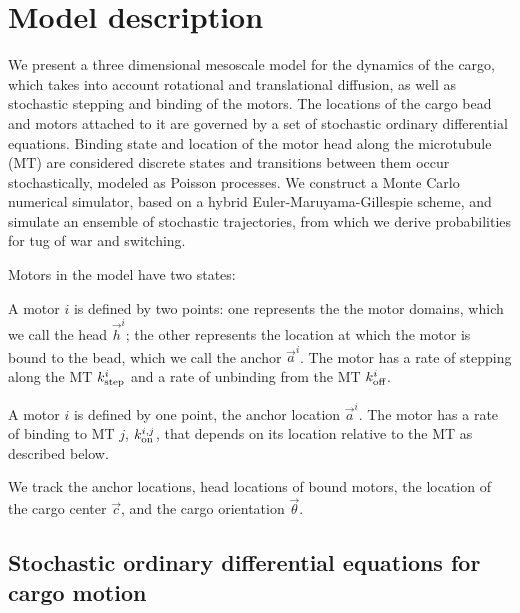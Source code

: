 \section{Model description} \label{description}

We present a three dimensional mesoscale model for the dynamics of the cargo, which takes into account rotational and translational diffusion, as well as stochastic stepping and binding of the motors. The locations of the cargo bead and motors attached to it are governed by a set of stochastic ordinary differential equations. Binding state and location of the motor head along the microtubule (MT) are considered discrete states and transitions between them occur stochastically, modeled as Poisson processes. We construct a Monte Carlo numerical simulator, based on a hybrid Euler-Maruyama-Gillespie scheme, and simulate an ensemble of stochastic trajectories, from which we  derive probabilities for tug of war and switching.

Motors in the model have two states:
\begin{description}[labelindent=\parindent,font=\normalfont]
\item[Bound:] A motor $i$ is defined by two points: one represents the the motor domains, which we call the head $\vec{h}^i$; the other represents the location at which the motor is bound to the bead, which we call the anchor $\vec{a}^i$. The motor has a rate of stepping along the MT $k_\text{step}^i$ and a rate of unbinding from the MT $k_\text{off}^i$.
\item[Unbound:] A motor $i$ is defined by one point, the anchor location $\vec{a}^i$. The motor has a rate of binding to MT $j$, $k_\text{on}^{i,j}$, that depends on its location relative to the MT as described below.
\end{description}
We track the anchor locations, head locations of bound motors, the location of the cargo center $\vec{c}$, and the cargo orientation $\vec{\theta}$.

\subsection{Stochastic ordinary differential equations for cargo motion}


